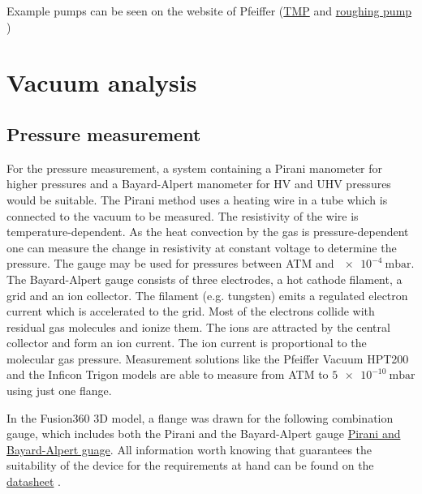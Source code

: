 Example pumps can be seen on the website of Pfeiffer (\href{https://www.pfeiffer-vacuum.com/global/en/shop/products/TMAAAC681101}{TMP} \cite{ATH3204} and \href{https://www.pfeiffer-vacuum.com/api/empolis/resource/environment/project1_p/documents/pfeifferSharepointProd/61856-Datasheet_V9SABSCZMR01_en.pdf}{roughing pump} \cite{ACP90})

\section{Vacuum analysis}

\subsection{Pressure measurement} \label{sec:pressure_measurement}

For the pressure measurement, a system containing a Pirani manometer for higher pressures and a Bayard-Alpert manometer for HV and UHV pressures would be suitable.
The Pirani method uses a heating wire in a tube which is connected to the vacuum to be measured.
The resistivity of the wire is temperature-dependent.
As the heat convection by the gas is pressure-dependent one can measure the change in resistivity at constant voltage to determine the pressure.
The gauge may be used for pressures between ATM and $\SI{e-4}{\milli\bar}$.
The Bayard-Alpert gauge consists of three electrodes, a hot cathode filament, a grid and an ion collector.
The filament (e.g. tungsten) emits a regulated electron current which is accelerated to the grid.
Most of the electrons collide with residual gas molecules and ionize them.
The ions are attracted by the central collector and form an ion current.
The ion current is proportional to the molecular gas pressure.
Measurement solutions like the Pfeiffer Vacuum HPT200 \cite{HPT200} and the Inficon Trigon models \cite{BCG450} are able to measure from ATM to $\SI{5e-10}{\milli\bar}$ using just one flange.

In the Fusion360 3D model, a flange was drawn for the following combination gauge, which includes both the Pirani and the Bayard-Alpert gauge \href{https://www.pfeiffer-vacuum.com/global/de/shop/products/PT_T12_366_300}{Pirani and Bayard-Alpert guage}.
All information worth knowing that guarantees the suitability of the device for the requirements at hand can be found on the \href{https://www.pfeiffer-vacuum.com/global/de/shop/products/PT_T12_366_300}{datasheet} \cite{pfeifferdruck}.




